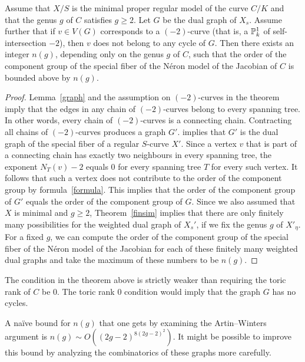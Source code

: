 \begin{thm}\label{uniformbound}
 Assume that $X/S$ is the minimal proper regular model of the curve $C/K$ and that the genus $g$ of $C$ satisfies $g \geq 2$. Let $G$ be the dual graph of $X_s$. Assume further that if $v \in V(G)$ corresponds to a $(-2)$-curve (that is, a $\P^1_k$ of self-intersection $-2$), then $v$ does not belong to any cycle of $G$. Then there exists an integer $n(g)$, depending only on the genus $g$ of $C$, such that the order of the component group of the special fiber of the N\'{e}ron model of the Jacobian of $C$ is bounded above by $n(g)$.
\end{thm}
\begin{proof}
Lemma~\ref{graph} and the assumption on $(-2)$-curves in the theorem imply that the edges in any chain of $(-2)$-curves belong to every spanning tree. In other words, every chain of $(-2)$-curves is a connecting chain. Contracting all chains of $(-2)$-curves produces a graph $G'$. \cite[Corollary~4.3]{winters} implies that $G'$ is the dual graph of the special fiber of a regular $S$-curve $X'$. Since a vertex $v$ that is part of a connecting chain has exactly two neighbours in every spanning tree, the exponent $N_T(v)-2$ equals $0$ for every spanning tree $T$ for every such vertex. It follows that such a vertex does not contribute to the order of the component group by formula~\eqref{formula}. This implies that the order of the component group of $G'$ equals the order of the component group of $G$. Since we also assumed that $X$ is minimal and $g \geq 2$, Theorem~\ref{finsim} implies that there are only finitely many possibilities for the weighted dual graph of $X_s'$, if we fix the genus $g$ of $X'_{\eta}$. For a fixed $g$, we can compute the order of the component group of the special fiber of the N\'{e}ron model of the Jacobian for each of these finitely many weighted dual graphs and take the maximum of these numbers to be $n(g)$. 
\end{proof}

\begin{rmk}
 The condition in the theorem above is strictly weaker than requiring the toric rank of $C$ be $0$. The toric rank $0$ condition would imply that the graph $G$ has no cycles.
\end{rmk}

\begin{rmk}
 A na\"{i}ve bound for $n(g)$ that one gets by examining the Artin--Winters argument is $n(g) \sim O((2g-2)^{8(2g-2)^2})$. It might be possible to improve this bound by analyzing the combinatorics of these graphs more carefully.
\end{rmk}

